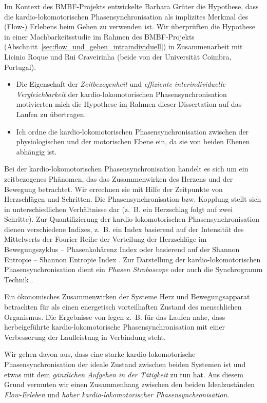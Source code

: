 Im Kontext des \acs{BMBF}-Projekts entwickelte Barbara Grüter die Hypothese, dass die kardio-lokomotorischen Phasensynchronisation als implizites Merkmal des (Flow-) Erlebens beim Gehen zu verwenden ist. Wir überprüften die Hypothese in einer Machbarkeitsstudie im Rahmen des \acs{BMBF}-Projekts (Abschnitt~\ref{sec:flow_und_gehen_intraindividuell}) in Zusammenarbeit mit Licinio Roque und Rui Craveirinha (beide von der Universität Coimbra, Portugal). 
\begin{itemize}
	
	\item Die Eigenschaft der \emph{Zeitbezogenheit} und \emph{effiziente interindividuelle Vergleichbarkeit} der kardio-lokomotorischen Phasensynchronisation motivierten mich die Hypothese im Rahmen dieser Dissertation auf das Laufen zu übertragen.
	
	\item Ich ordne die kardio-lokomotorischen Phasensynchronisation zwischen der physiologischen und der motorischen Ebene ein, da sie von beiden Ebenen abhängig ist.
	
\end{itemize}

Bei der kardio-lokomotorischen Phasensynchronisation handelt es sich um ein zeitbezogenes Phänomen, das das Zusammenwirken des Herzens und der Bewegung betrachtet. Wir errechnen sie mit Hilfe der Zeitpunkte von Herzschlägen und Schritten. Die Phasensynchronisation bzw. Kopplung stellt sich in unterschiedlichen Verhältnisse dar (z.~B. ein Herzschlag folgt auf zwei Schritte). Zur Quantifizierung der kardio-lokomotorischen Phasensynchronisation dienen verschiedene Indizes, z.~B. ein Index basierend auf der Intensität des Mittelwerts der Fourier Reihe der Verteilung der Herzschläge im Bewegungszyklus -- Phasenkohärenz Index \citep{Rosenblum2003} oder basierend auf der Shannon Entropie -- Shannon Entropie Index \citep{Tass1998, Niizeki2005}. Zur Darstellung der kardio-lokomotorischen Phasensynchronisation dient ein \emph{Phasen Stroboscope} \citep{Mrowka2000} oder auch die Synchrogramm Technik \citep{Schafer1999}.

Ein ökonomisches Zusammenwirken der Systeme Herz und Bewegungsapparat betrachten für \citet[S.~18]{Niizeki2014} als einen energetisch vorteilhaften Zustand des menschlichen Organismus. Die Ergebnisse von \citet{Phillips2013} legen z.~B. für das Laufen nahe, dass herbeigeführte kardio-lokomotorische Phasensynchronisation mit einer Verbesserung der Laufleistung in Verbindung steht.

Wir gehen davon aus, dass eine starke kardio-lokomotorische Phasensynchronisation der ideale Zustand zwischen beiden Systemen ist und etwas mit dem \emph{gänzlichen Aufgehen in der Tätigkeit} zu tun hat. Aus diesem Grund vermuten wir einen Zusammenhang zwischen den beiden Idealzuständen \emph{Flow-Erleben} und \emph{hoher kardio-lokomotorischer Phasensynchronisation}.

